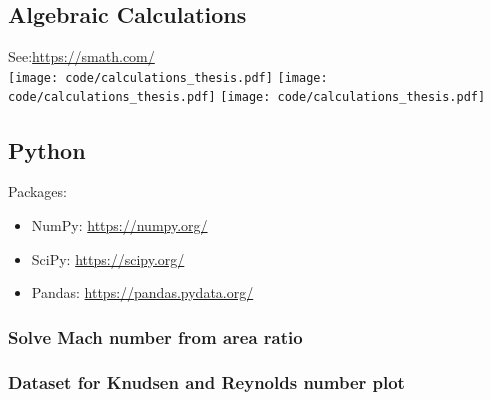 \subsection{Algebraic Calculations}
\label{apx:smath}
See:\quad \url{https://smath.com/}\\

\texttt{[image: code/calculations\_thesis.pdf]}
\newpage
\texttt{[image: code/calculations\_thesis.pdf]}
\newpage
\texttt{[image: code/calculations\_thesis.pdf]}
\newpage

\subsection{Python}
Packages:
\begin{itemize}
	\item NumPy: \quad \url{https://numpy.org/}
	\item SciPy: \quad \url{https://scipy.org/}
	\item Pandas: \quad \url{https://pandas.pydata.org/}
\end{itemize}
\subsubsection{Solve Mach number from area ratio}
\label{apx:mach-py}


\subsubsection{Dataset for Knudsen and Reynolds number plot}
\label{apx:knudsen-plot-py}

